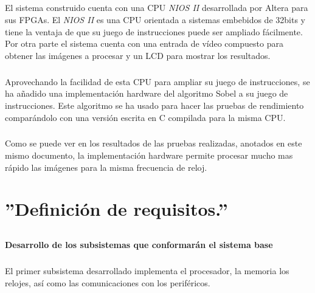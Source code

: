 \documentclass[a4paper,12pt,titlepage,final]{book}
\begin{document}
\paragraph{}
El sistema construido cuenta con una CPU \textit{NIOS II} desarrollada por Altera para sus FPGAs. El \textit{NIOS II} es una CPU orientada a sistemas embebidos de 32bits y tiene la ventaja de que su juego de instrucciones puede ser ampliado fácilmente. Por otra parte el sistema cuenta con una entrada de vídeo compuesto para obtener las imágenes a procesar y un LCD para mostrar los resultados.

\paragraph{}
Aprovechando la facilidad de esta CPU para ampliar su juego de instrucciones, se ha añadido una implementación hardware del algoritmo Sobel a su juego de instrucciones. Este algoritmo se ha usado para hacer las pruebas de rendimiento comparándolo con una versión escrita en C compilada para la misma CPU.

\paragraph{}
Como se puede ver en los resultados de las pruebas realizadas, anotados en este mismo documento, la implementación hardware permite procesar mucho mas rápido las imágenes para la misma frecuencia de reloj.

\chapter{''Definición de requisitos.''} \label{chap:defreq}

\section*{}
\subsection*{}

\subsubsection{Desarrollo de los subsistemas que conformarán el sistema base}

\paragraph{}
El primer subsistema desarrollado implementa el procesador, la memoria los relojes, así como las comunicaciones con los periféricos.
\end{document}
